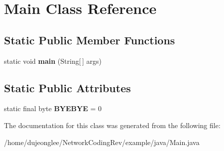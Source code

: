 \hypertarget{class_main}{}\section{Main Class Reference}
\label{class_main}
\subsection*{Static Public Member Functions}
\begin{DoxyCompactItemize}
\item 
static void {\bfseries main} (String\mbox{[}$\,$\mbox{]} args)\hypertarget{class_main_a8a5d0f827edddff706cc0e6740d0579a}{}\label{class_main_a8a5d0f827edddff706cc0e6740d0579a}

\end{DoxyCompactItemize}
\subsection*{Static Public Attributes}
\begin{DoxyCompactItemize}
\item 
static final byte {\bfseries B\+Y\+E\+B\+YE} = 0\hypertarget{class_main_ad30bf8d1cad092721ec4a6d278a22208}{}\label{class_main_ad30bf8d1cad092721ec4a6d278a22208}

\end{DoxyCompactItemize}


The documentation for this class was generated from the following file\+:\begin{DoxyCompactItemize}
\item 
/home/dujeonglee/\+Network\+Coding\+Rev/example/java/Main.\+java\end{DoxyCompactItemize}
